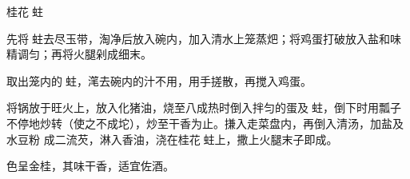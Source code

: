 %
%
%
%
%
%
%
\begin{recipe}{桂花𧎼蛀}

\ingredients


\preparation

\step 先将𧎼蛀去尽玉带，淘净后放入碗内，加入清水上笼蒸𤆵；将鸡蛋打破放入盐和味
精调匀；再将火腿剁成细末。

\step 取出笼内的𧎼蛀，滗去碗内的汁不用，用手搓散，再搅入鸡蛋。

\step 将锅放于旺火上，放入化猪油，烧至八成热时倒入拌匀的蛋及𧎼蛀，倒下时用瓢子
不停地炒转（使之不成坨），炒至干香为止。搛入走菜盘内，再倒入清汤，加盐及水豆粉
成二流芡，淋入香油，浇在桂花𧎼蛀上，撒上火腿末子即成。

\features

色呈金桂，其味干香，适宜佐酒。

\end{recipe}

